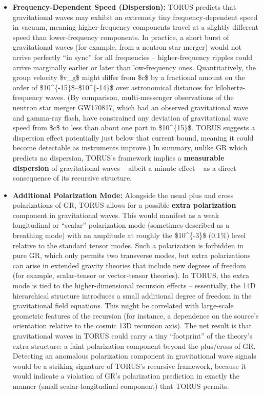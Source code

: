 \documentclass[]{article}
\begin{document}
\begin{itemize}
\item
  \textbf{Frequency-Dependent Speed (Dispersion):} TORUS predicts that
  gravitational waves may exhibit an extremely tiny frequency-dependent
  speed in vacuum, meaning higher-frequency components travel at a
  slightly different speed than lower-frequency components​. In
  practice, a short burst of gravitational waves (for example, from a
  neutron star merger) would not arrive perfectly ``in sync'' for all
  frequencies -- higher-frequency ripples could arrive marginally
  earlier or later than low-frequency ones. Quantitatively, the group
  velocity \$v\_g\$ might differ from \$c\$ by a fractional amount on
  the order of \$10\^{}\{-15\}\$--\$10\^{}\{-14\}\$ over astronomical
  distances for kilohertz-frequency waves​. (By comparison,
  multi-messenger observations of the neutron star merger GW170817,
  which had an observed gravitational wave and gamma-ray flash, have
  constrained any deviation of gravitational wave speed from \$c\$ to
  less than about one part in \$10\^{}\{15\}\$​. TORUS suggests a
  dispersion effect potentially just below that current bound, meaning
  it could become detectable as instruments improve.) In summary, unlike
  GR which predicts no dispersion, TORUS's framework implies a
  \textbf{measurable dispersion} of gravitational waves -- albeit a
  minute effect -- as a direct consequence of its recursive structure.
\item
  \textbf{Additional Polarization Mode:} Alongside the usual plus and
  cross polarizations of GR, TORUS allows for a possible \textbf{extra
  polarization} component in gravitational waves​. This would manifest
  as a weak longitudinal or ``scalar'' polarization mode (sometimes
  described as a breathing mode) with an amplitude at roughly the
  \$10\^{}\{-3\}\$ (0.1\%) level relative to the standard tensor modes​.
  Such a polarization is forbidden in pure GR, which only permits two
  transverse modes, but extra polarizations can arise in extended
  gravity theories that include new degrees of freedom (for example,
  scalar-tensor or vector-tensor theories). In TORUS, the extra mode is
  tied to the higher-dimensional recursion effects -- essentially, the
  14D hierarchical structure introduces a small additional degree of
  freedom in the gravitational field equations. This might be correlated
  with large-scale geometric features of the recursion (for instance, a
  dependence on the source's orientation relative to the cosmic 13D
  recursion axis)​. The net result is that gravitational waves in TORUS
  could carry a tiny ``footprint'' of the theory's extra structure: a
  faint polarization component beyond the plus/cross of GR. Detecting an
  anomalous polarization component in gravitational wave signals would
  be a striking signature of TORUS's recursive framework, because it
  would indicate a violation of GR's polarization prediction in exactly
  the manner (small scalar-longitudinal component) that TORUS permits​.
\end{itemize}
\end{document}

